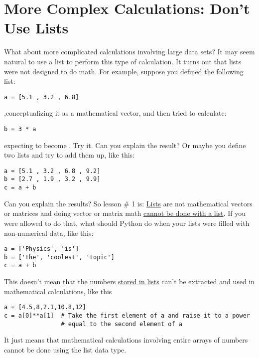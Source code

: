 \section{More Complex Calculations: Don't Use Lists}
What about more complicated calculations involving large data sets?
It may seem natural to use a list to perform this type of calculation.
It turns out that lists were not designed to do math. For example,
suppose you defined the following list:
\begin{Verbatim}
a = [5.1 , 3.2 , 6.8]
\end{Verbatim}
,conceptualizing it as a mathematical vector, and then tried to calculate:
\begin{Verbatim}
b = 3 * a
\end{Verbatim}
expecting  to become \code{[15.3,9.6,20.4]}.  Try it.  Can you
explain the result? Or maybe you define two lists and try to add them
up, like this:
\begin{Verbatim}
a = [5.1 , 3.2 , 6.8 , 9.2]
b = [2.7 , 1.9 , 3.2 , 9.9]
c = a + b
\end{Verbatim}
Can you explain the results?  So lesson \# 1 is: \ul{Lists} are not
mathematical vectors or matrices and doing vector or matrix math
\underline{cannot be done with a list}.  If you were allowed to do
that, what should Python do when your lists were filled with
non-numerical data, like this:
\begin{Verbatim}
a = ['Physics', 'is']
b = ['the', 'coolest', 'topic']
c = a + b
\end{Verbatim}
  This doesn't mean that the numbers \ul{stored in
  lists} can't be extracted and used in mathematical calculations,
like this
\begin{Verbatim}
a = [4.5,8,2.1,10.8,12]
c = a[0]**a[1]  # Take the first element of a and raise it to a power
                # equal to the second element of a
\end{Verbatim}
It just means that mathematical calculations involving entire arrays
of numbers cannot be done using the list data type.

